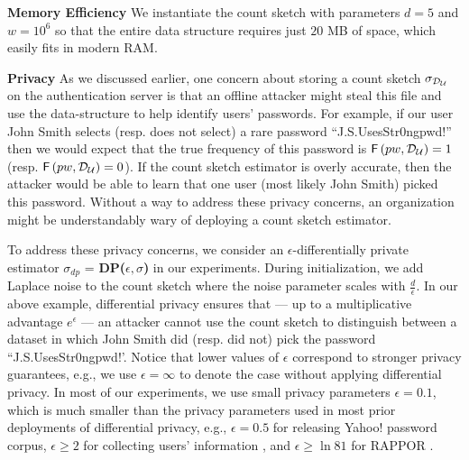 \textbf{Memory Efficiency} We instantiate the count sketch with parameters $d=5$ and $w=10^6$ so that the entire data structure requires just $20$ MB of space, which easily fits in modern RAM. 



\textbf{Privacy} As we discussed earlier, one concern about storing a count sketch $\sigma_{\mathcal{D}_{{\mathcal{U}}}} $ on the authentication server is that an offline attacker might steal this file and use the data-structure to help identify users' passwords. For example, if our user John Smith selects (resp. does not select) a rare password ``J.S.UsesStr0ngpwd!'' then we would expect that the true frequency of this password is $\mathsf{F}\left(pw, \mathcal{D}_{{\mathcal{U}}} \right)=1$ (resp. $\mathsf{F}\left(pw, \mathcal{D}_{{\mathcal{U}}} \right)=0$). If the count sketch estimator is overly accurate, then the attacker would be able to learn that one user (most likely John Smith) picked this password. Without a way to address these privacy concerns, an organization might be understandably wary of deploying a count sketch estimator.



To address these privacy concerns, we consider an $\epsilon$-differentially private estimator $\sigma_{dp}$ = \textbf{DP($\epsilon,\sigma$)} in our experiments. During initialization, we add Laplace noise to the count sketch where the noise parameter scales with $\frac{d}{\epsilon}$. In our above example, differential privacy ensures that --- up to a multiplicative advantage $e^{\epsilon}$ --- an attacker cannot use the count sketch to distinguish between a dataset in which John Smith did (resp. did not) pick the password ``J.S.UsesStr0ngpwd!'. Notice that lower values of $\epsilon$ correspond to stronger privacy guarantees, e.g., we use $\epsilon=\infty$ to denote the case without applying differential privacy. In most of our experiments, we use small privacy parameters $\epsilon=0.1$, which is much smaller than the privacy parameters used in most prior deployments of differential privacy, e.g., $\epsilon = 0.5$ for releasing Yahoo! password corpus\cite{NDSS:BloDatBon16}, $\epsilon \ge 2$ for collecting users' information \cite{AppleDPTeam}, and $\epsilon \ge  \ln{81}$ for RAPPOR \cite{CCS:ErlPihKor14,USENIX:WBLJ17}. 



